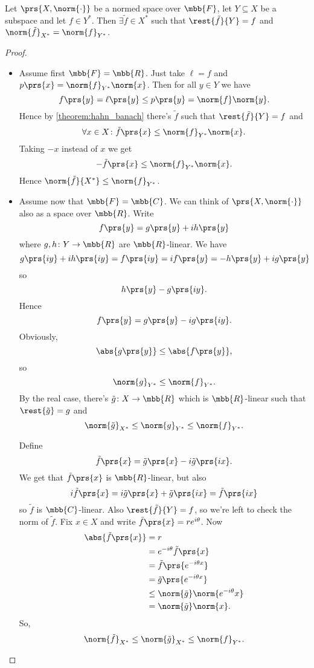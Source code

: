 \documentclass[10pt, twoside]{book}
\begin{document}
\begin{theorem}
\label{theorem:hahn_banach_2}
Let $\prs{X, \norm{\cdot}}$ be a normed space over $\mbb{F}$, let $Y \subseteq X$ be a subspace and let $f \in Y^*$. Then $\exists \tilde{f} \in X^*$ such that $\rest{\tilde{f}}{Y} = f$ and $\norm{\tilde{f}}_{X^*} = \norm{f}_{Y^*}$.   
\end{theorem}

\begin{proof}
\begin{itemize}
\item Assume first $\mbb{F} = \mbb{R}$.
Just take $\ell = f$ and $p\prs{x} = \norm{f}_{Y^*} \norm{x}$.
Then for all $y \in Y$ we have
\[f\prs{y} = \ell\prs{y} \leq p\prs{y} = \norm{f} \norm{y} \text{.}\]
Hence by \ref{theorem:hahn_banach} there's $\tilde{f}$ such that $\rest{\tilde{f}}{Y} = f$ and
\[\forall x \in X \colon \tilde{f}\prs{x} \leq \norm{f}_{Y^*} \norm{x} \text{.}\]
Taking $-x$ instead of $x$ we get
\[-\tilde{f}\prs{x} \leq \norm{f}_{Y^*} \norm{x} \text{.}\]
Hence
$\norm{\tilde{f}}{X^*} \leq \norm{f}_{Y^*}$.
\item Assume now that $\mbb{F} = \mbb{C}$.
We can think of $\prs{X, \norm{\cdot}}$ also as a space over $\mbb{R}$. Write
\[f\prs{y} = g\prs{y} + i h\prs{y}\]
where $g,h \colon Y \to \mbb{R}$ are $\mbb{R}$-linear.
We have
\[g\prs{iy} + ih\prs{iy} = f\prs{iy} = if\prs{y} = -h\prs{y} + i g\prs{y}\]
so
\[h\prs{y} - g\prs{iy} \text{.}\]
Hence
\[f\prs{y} = g\prs{y} - ig\prs{iy} \text{.}\]
Obviously,
\[\abs{g\prs{y}} \leq \abs{f\prs{y}} \text{,}\]
so
\[\norm{g}_{Y^*} \leq \norm{f}_{Y^*} \text{.}\]
By the real case, there's $\tilde{g} \colon X \to \mbb{R}$ which is $\mbb{R}$-linear such that $\rest{\tilde{g}} = g$ and \[\norm{\tilde{g}}_{X^*} \leq \norm{g}_{Y^*} \leq \norm{f}_{Y^*} \text{.}\]

Define
\[\tilde{f}\prs{x} = \tilde{g}\prs{x} - i \tilde{g}\prs{ix} \text{.}\]
We get that $\tilde{f}\prs{x}$ is $\mbb{R}$-linear, but also
\[i \tilde{f}\prs{x} = i \tilde{g}\prs{x} + \tilde{g}\prs{ix} = \tilde{f}\prs{ix}\]
so $\tilde{f}$ is $\mbb{C}$-linear.
Also
$\rest{\tilde{f}}{Y} = f$, so we're left to check the norm of $\tilde{f}$.
Fix $x \in X$ and write $\tilde{f}\prs{x} = re^{i\theta}$.
Now
\begin{align*}
\abs{\tilde{f}\prs{x}} &= r
\\&=
e^{-i\theta} \tilde{f}\prs{x}
\\&=
\tilde{f}\prs{e^{-i\theta x}}
\\&=
\tilde{g} \prs{e^{-i\theta x}}
\\&\leq
\norm{\tilde{g}} \norm{e^{-i\theta} x}
\\&=
\norm{\tilde{g}}\norm{x} \text{.}
\end{align*}
So,
\[\norm{\tilde{f}}_{X^*} \leq \norm{\tilde{g}}_{X^*} \leq \norm{f}_{Y^*} \text{.}\]
\end{itemize}
\end{proof}
\end{document}
